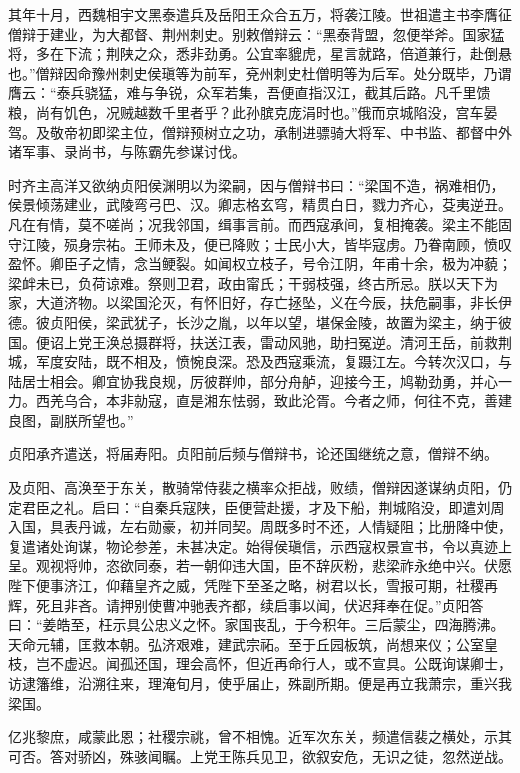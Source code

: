 \documentclass[12pt,UTF8]{ctexbook}
\begin{document}
其年十月，西魏相宇文黑泰遣兵及岳阳王众合五万，将袭江陵。世祖遣主书李膺征僧辩于建业，为大都督、荆州刺史。别敕僧辩云：“黑泰背盟，忽便举斧。国家猛将，多在下流；荆陕之众，悉非劲勇。公宜率貔虎，星言就路，倍道兼行，赴倒悬也。”僧辩因命豫州刺史侯瑱等为前军，兗州刺史杜僧明等为后军。处分既毕，乃谓膺云：“泰兵骁猛，难与争锐，众军若集，吾便直指汉江，截其后路。凡千里馈粮，尚有饥色，况贼越数千里者乎？此孙膑克庞涓时也。”俄而京城陷没，宫车晏驾。及敬帝初即梁主位，僧辩预树立之功，承制进骠骑大将军、中书监、都督中外诸军事、录尚书，与陈霸先参谋讨伐。

时齐主高洋又欲纳贞阳侯渊明以为梁嗣，因与僧辩书曰：“梁国不造，祸难相仍，侯景倾荡建业，武陵弯弓巴、汉。卿志格玄穹，精贯白日，戮力齐心，芟夷逆丑。凡在有情，莫不嗟尚；况我邻国，缉事言前。而西寇承间，复相掩袭。梁主不能固守江陵，殒身宗祐。王师未及，便已降败；士民小大，皆毕寇虏。乃眷南顾，愤叹盈怀。卿臣子之情，念当鲠裂。如闻权立枝子，号令江阴，年甫十余，极为冲藐；梁衅未已，负荷谅难。祭则卫君，政由甯氏；干弱枝强，终古所忌。朕以天下为家，大道济物。以梁国沦灭，有怀旧好，存亡拯坠，义在今辰，扶危嗣事，非长伊德。彼贞阳侯，梁武犹子，长沙之胤，以年以望，堪保金陵，故置为梁主，纳于彼国。便诏上党王涣总摄群将，扶送江表，雷动风驰，助扫冤逆。清河王岳，前救荆城，军度安陆，既不相及，愤惋良深。恐及西寇乘流，复蹑江左。今转次汉口，与陆居士相会。卿宜协我良规，厉彼群帅，部分舟舻，迎接今王，鸠勒劲勇，并心一力。西羌乌合，本非勍寇，直是湘东怯弱，致此沦胥。今者之师，何往不克，善建良图，副朕所望也。”

贞阳承齐遣送，将届寿阳。贞阳前后频与僧辩书，论还国继统之意，僧辩不纳。

及贞阳、高涣至于东关，散骑常侍裴之横率众拒战，败绩，僧辩因遂谋纳贞阳，仍定君臣之礼。启曰：“自秦兵寇陕，臣便营赴援，才及下船，荆城陷没，即遣刘周入国，具表丹诚，左右勋豪，初并同契。周既多时不还，人情疑阻；比册降中使，复遣诸处询谋，物论参差，未甚决定。始得侯瑱信，示西寇权景宣书，令以真迹上呈。观视将帅，恣欲同泰，若一朝仰违大国，臣不辞灰粉，悲梁祚永绝中兴。伏愿陛下便事济江，仰藉皇齐之威，凭陛下至圣之略，树君以长，雪报可期，社稷再辉，死且非吝。请押别使曹冲驰表齐都，续启事以闻，伏迟拜奉在促。”贞阳答曰：“姜皓至，枉示具公忠义之怀。家国丧乱，于今积年。三后蒙尘，四海腾沸。天命元辅，匡救本朝。弘济艰难，建武宗祏。至于丘园板筑，尚想来仪；公室皇枝，岂不虚迟。闻孤还国，理会高怀，但近再命行人，或不宣具。公既询谋卿士，访逮籓维，沿溯往来，理淹旬月，使乎届止，殊副所期。便是再立我萧宗，重兴我梁国。

亿兆黎庶，咸蒙此恩；社稷宗祧，曾不相愧。近军次东关，频遣信裴之横处，示其可否。答对骄凶，殊骇闻瞩。上党王陈兵见卫，欲叙安危，无识之徒，忽然逆战。
\end{document}
